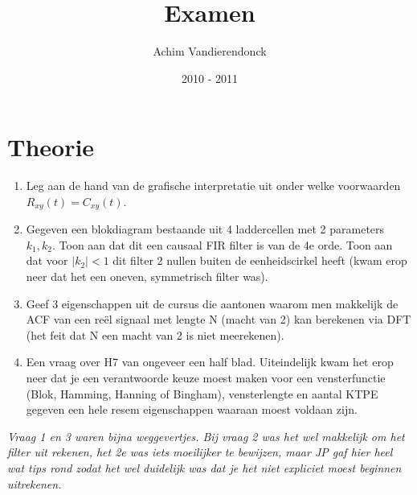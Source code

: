 \documentclass[a4paper]{article}
\title{Examen}
\author{Achim Vandierendonck}
\date{2010 - 2011}
\begin{document}
\maketitle

\section{Theorie}
\begin{enumerate}
	\item Leg aan de hand van de grafische interpretatie uit onder welke voorwaarden $R_{xy}(t) = C_{xy}(t)$.
	\item Gegeven een blokdiagram bestaande uit 4 laddercellen met 2 parameters $k_1, k_2$. Toon aan dat dit een causaal FIR filter is van de 4e orde. Toon aan dat voor $|k_2|<1$ dit filter 2 nullen buiten de eenheidscirkel heeft (kwam erop neer dat het een oneven, symmetrisch filter was).
	\item Geef 3 eigenschappen uit de cursus die aantonen waarom men makkelijk de ACF van een reël signaal met lengte N (macht van 2) kan berekenen via DFT (het feit dat N een macht van 2 is niet meerekenen).
	\item Een vraag over H7 van ongeveer een half blad. Uiteindelijk kwam het erop neer dat je een verantwoorde keuze moest maken voor een vensterfunctie (Blok, Hamming, Hanning of Bingham), vensterlengte en aantal KTPE gegeven een hele resem eigenschappen waaraan moest voldaan zijn.
\end{enumerate}
\textit{Vraag 1 en 3 waren bijna weggevertjes. Bij vraag 2 was het wel makkelijk om het filter uit rekenen, het 2e was iets moeilijker te bewijzen, maar JP gaf hier heel wat tips rond zodat het wel duidelijk was dat je het niet expliciet moest beginnen uitrekenen.}
\end{document}
